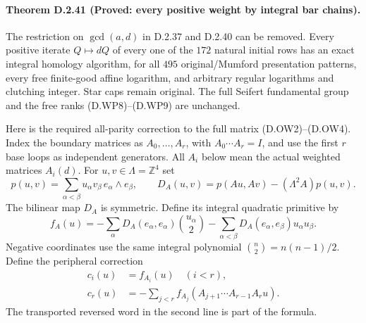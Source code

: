 \paragraph{Theorem D.2.41 (Proved: every positive weight by integral bar chains).}
The restriction on $\gcd(a,d)$ in D.2.37 and D.2.40 can
be removed. Every positive iterate $Q\mapsto dQ$ of
every one of the $172$ natural initial rows has an
exact integral homology algorithm, for all $495$
original/Mumford presentation patterns, every free
finite-good affine logarithm, and arbitrary regular
logarithms and clutching integer. Star caps remain
original. The full Seifert fundamental group and
the free ranks (D.WP8)--(D.WP9) are unchanged.

Here is the required all-parity correction to the
full matrix (D.OW2)--(D.OW4). Index the boundary
matrices as $A_0,\ldots,A_r$, with
$A_0\cdots A_r=I$, and use the first $r$ base loops
as independent generators. All $A_i$ below mean
the actual weighted matrices $A_i(d)$.
For $u,v\in\Lambda=\mathbb Z^4$ set
\[
 p(u,v)=\sum_{\alpha<\beta}u_\alpha v_\beta\,
                  e_\alpha\wedge e_\beta,\qquad
 D_A(u,v)=p(Au,Av)-(\Lambda^2A)p(u,v).
                                                        \tag{D.BC1}
\]
The bilinear map $D_A$ is symmetric. Define its
integral quadratic primitive by
\[
 f_A(u)=-\sum_\alpha D_A(e_\alpha,e_\alpha)
                       {u_\alpha\choose2}
        -\sum_{\alpha<\beta}D_A(e_\alpha,e_\beta)
                       u_\alpha u_\beta .
                                                        \tag{D.BC2}
\]
Negative coordinates use the same integral polynomial
$\binom n2=n(n-1)/2$.
Define the peripheral correction
\[
 \begin{split}
 c_i(u)&=f_{A_i}(u) \quad (i<r),\\
 c_r(u)&=-\sum_{j<r}
       f_{A_j}(A_{j+1}\cdots A_{r-1}A_r u).
 \end{split}                                            \tag{D.BC3}
\]
The transported reversed word in the second line
is part of the formula.

